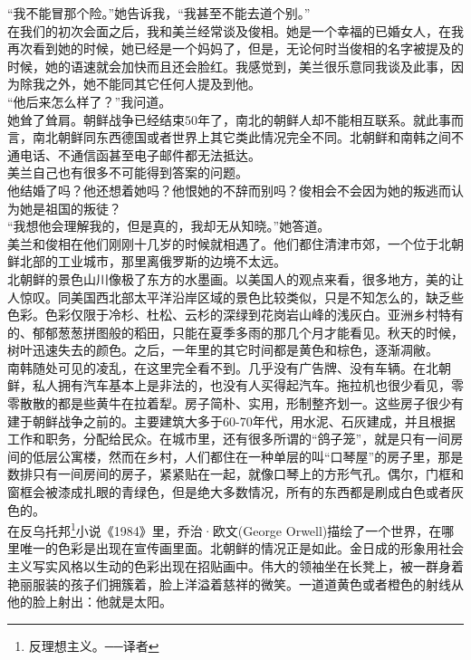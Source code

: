 “我不能冒那个险。”她告诉我，“我甚至不能去道个别。”\\

在我们的初次会面之后，我和美兰经常谈及俊相。她是一个幸福的已婚女人，在我再次看到她的时候，她已经是一个妈妈了，但是，无论何时当俊相的名字被提及的时候，她的语速就会加快而且还会脸红。我感觉到，美兰很乐意同我谈及此事，因为除我之外，她不能同其它任何人提及到他。\\

“他后来怎么样了？”我问道。\\

她耸了耸肩。朝鲜战争已经结束50年了，南北的朝鲜人却不能相互联系。就此事而言，南北朝鲜同东西德国或者世界上其它类此情况完全不同。北朝鲜和南韩之间不通电话、不通信函甚至电子邮件都无法抵达。\\

美兰自己也有很多不可能得到答案的问题。\\

他结婚了吗？他还想着她吗？他恨她的不辞而别吗？俊相会不会因为她的叛逃而认为她是祖国的叛徒？\\

“我想他会理解我的，但是真的，我却无从知晓。”她答道。\\

美兰和俊相在他们刚刚十几岁的时候就相遇了。他们都住清津市郊，一个位于北朝鲜北部的工业城市，那里离俄罗斯的边境不太远。\\

北朝鲜的景色山川像极了东方的水墨画。以美国人的观点来看，很多地方，美的让人惊叹。同美国西北部太平洋沿岸区域的景色比较类似，只是不知怎么的，缺乏些色彩。色彩仅限于冷杉、杜松、云杉的深绿到花岗岩山峰的浅灰白。亚洲乡村特有的、郁郁葱葱拼图般的稻田，只能在夏季多雨的那几个月才能看见。秋天的时候，树叶迅速失去的颜色。之后，一年里的其它时间都是黄色和棕色，逐渐凋敝。\\

南韩随处可见的凌乱，在这里完全看不到。几乎没有广告牌、没有车辆。在北朝鲜，私人拥有汽车基本上是非法的，也没有人买得起汽车。拖拉机也很少看见，零零散散的都是些黄牛在拉着犁。房子简朴、实用，形制整齐划一。这些房子很少有建于朝鲜战争之前的。主要建筑大多于60-70年代，用水泥、石灰建成，并且根据工作和职务，分配给民众。在城市里，还有很多所谓的“鸽子笼”，就是只有一间房间的低层公寓楼，然而在乡村，人们都住在一种单层的叫“口琴屋”的房子里，那是数排只有一间房间的房子，紧紧贴在一起，就像口琴上的方形气孔。偶尔，门框和窗框会被漆成扎眼的青绿色，但是绝大多数情况，所有的东西都是刷成白色或者灰色的。\\

在反乌托邦\footnote{反理想主义。──译者}小说《1984》里，乔治·欧文(George Orwell)描绘了一个世界，在哪里唯一的色彩是出现在宣传画里面。北朝鲜的情况正是如此。金日成的形象用社会主义写实风格以生动的色彩出现在招贴画中。伟大的领袖坐在长凳上，被一群身着艳丽服装的孩子们拥簇着，脸上洋溢着慈祥的微笑。一道道黄色或者橙色的射线从他的脸上射出：他就是太阳。\\

